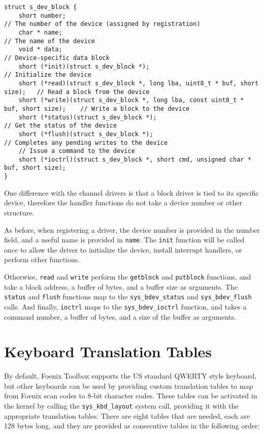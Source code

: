 \begin{lstlisting}
struct s_dev_block {
    short number;           														// The number of the device (assigned by registration)
    char * name;            														// The name of the device
    void * data;																	// Device-specific data block
    short (*init)(struct s_dev_block *);        									// Initialize the device
    short (*read)(struct s_dev_block *, long lba, uint8_t * buf, short size);	// Read a block from the device
    short (*write)(struct s_dev_block *, long lba, const uint8_t * buf, short size);	// Write a block to the device
    short (*status)(struct s_dev_block *);      									// Get the status of the device
    short (*flush)(struct s_dev_block *);      										// Completes any pending writes to the device
    // Issue a command to the device
    short (*ioctrl)(struct s_dev_block *, short cmd, unsigned char * buf, short size);
}
\end{lstlisting}

One difference with the channel drivers is that a block driver is tied to its specific device, therefore the handler functions do not take a device number or other structure.

As before, when registering a driver, the device number is provided in the number field, and a useful name is provided in \verb+name+. The \verb+init+ function will be called once to allow the driver to initialize the device, install interrupt handlers, or perform other functions.

Otherwise, \verb+read+ and \verb+write+ perform the \verb+getblock+ and \verb+putblock+ functions, and take a block address, a buffer of bytes, and a buffer size as arguments. The \verb+status+ and \verb+flush+ functions map to the \verb+sys_bdev_status+ and \verb+sys_bdev_flush+ calls. And finally, \verb+ioctrl+ maps to the \verb+sys_bdev_ioctrl+ function, and takes a command number, a buffer of bytes, and a size of the buffer as arguments.

\section{Keyboard Translation Tables}
By default, Foenix Toolbox supports the US standard QWERTY style keyboard, but other keyboards can be used by providing custom translation tables to map from Foenix scan codes to 8-bit character codes. These tables can be activated in the kernel by calling the \verb+sys_kbd_layout+ system call, providing it with the appropriate translation tables. There are eight tables that are needed, each are 128 bytes long, and they are provided as consecutive tables in the following order:

